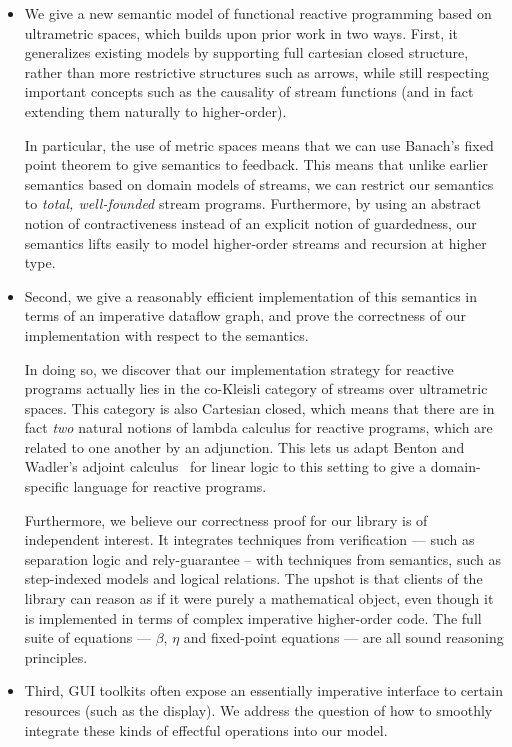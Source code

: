 \documentclass[preprint]{sigplanconf}
\begin{document}
\begin{itemize}
\item We give a new semantic model of functional reactive programming
  based on ultrametric spaces, which builds upon prior work in two
  ways. First, it generalizes existing models by supporting full
  cartesian closed structure, rather than more restrictive structures
  such as arrows, while still respecting important concepts such as
  the causality of stream functions (and in fact extending them
  naturally to higher-order). 

  In particular, the use of metric spaces means that we can use
  Banach's fixed point theorem to give semantics to feedback. This
  means that unlike earlier semantics based on domain models of
  streams, we can restrict our semantics to \emph{total, well-founded}
  stream programs. Furthermore, by using an abstract notion of
  contractiveness instead of an explicit notion of guardedness, our
  semantics lifts easily to model higher-order streams and recursion
  at higher type.

\item Second, we give a reasonably efficient implementation of this
  semantics in terms of an imperative dataflow graph, and prove the
  correctness of our implementation with respect to the semantics.  

  In doing so, we discover that our implementation strategy for
  reactive programs actually lies in the co-Kleisli category of
  streams over ultrametric spaces. This category is also Cartesian
  closed, which means that there are in fact \emph{two} natural
  notions of lambda calculus for reactive programs, which are related
  to one another by an adjunction. This lets us adapt Benton and
  Wadler's adjoint calculus~\cite{benton-wadler} for linear logic to
  this setting to give a domain-specific language for reactive
  programs.

  Furthermore, we believe our correctness proof for our library is of
  independent interest. It integrates techniques from verification ---
  such as separation logic and rely-guarantee -- with techniques from
  semantics, such as step-indexed models and logical relations. The
  upshot is that clients of the library can reason as if it were
  purely a mathematical object, even though it is implemented in terms
  of complex imperative higher-order code. The full suite of equations
  --- $\beta$, $\eta$ and fixed-point equations --- are all sound
  reasoning principles.

\item Third, GUI toolkits often expose an essentially imperative
  interface to certain resources (such as the display). We address the
  question of how to smoothly integrate these kinds of effectful
  operations into our model. 
\end{itemize}
\end{document}
